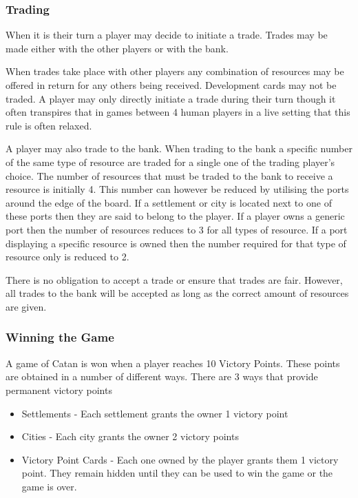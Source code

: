 \documentclass[]{article}
\begin{document}
\subsubsection{Trading}
When it is their turn a player may decide to initiate a trade. Trades may be made either with the other players or with the bank.

\par When trades take place with other players any combination of resources may be offered in return for any others being received. Development cards may not be traded. A player may only directly initiate a trade during their turn though it often transpires that in games between 4 human players in a live setting that this rule is often relaxed.

\par A player may also trade to the bank. When trading to the bank a specific number of the same type of resource are traded for a single one of the trading player's choice. The number of resources that must be traded to the bank to receive a resource is initially 4. This number can however be reduced by utilising the ports around the edge of the board. If a settlement or city is located next to one of these ports then they are said to belong to the player. If a player owns a generic port then the number of resources reduces to 3 for all types of resource. If a port displaying a specific resource is owned then the number required for that type of resource only is reduced to 2.

\par There is no obligation to accept a trade or ensure that trades are fair. However, all trades to the bank will be accepted as long as the correct amount of resources are given.


\subsubsection{Winning the Game}
A game of Catan is won when a player reaches 10 Victory Points. These points are obtained in a number of different ways. There are 3 ways that provide permanent victory points

\begin{itemize}
	\item Settlements - Each settlement grants the owner 1 victory point
	\item Cities - Each city grants the owner 2 victory points
	\item Victory Point Cards - Each one owned by the player grants them 1 victory point. They remain hidden until they can be used to win the game or the game is over.
\end{itemize}
\end{document}

